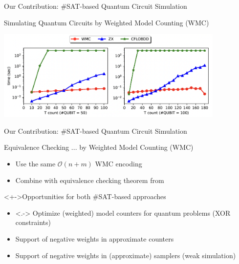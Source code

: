 \begin{refframe}{\alert{Our Contribution:} \#SAT-based Quantum Circuit Simulation}

Simulating Quantum Circuits by Weighted Model Counting (WMC) \cite{mei2024simulating}

\includegraphics[height=4.5cm]{graphics/random-quokka}

	
\end{refframe}



%
\begin{refframe}{\alert{Our Contribution:} \#SAT-based Quantum Circuit Simulation}

\begin{block}{Equivalence Checking ... by Weighted Model Counting (WMC)\cite{mei2024eq}}
\begin{itemize}
\item<+-> Use the same $\mathcal O(n +m)$ WMC encoding
\item<+-> Combine with equivalence checking theorem from~\cite{ours} 
\end{itemize}
\end{block}


\begin{alertblock}<+->{Opportunities for both \#SAT-based approaches}
\begin{itemize}
\item<.-> Optimize (weighted) model counters for quantum problems (XOR constraints)
\item<+-> Support of negative weights in approximate counters
\item<+-> Support of negative weights in (approximate) samplers (weak simulation)
\end{itemize}
\end{alertblock}

\end{refframe}





